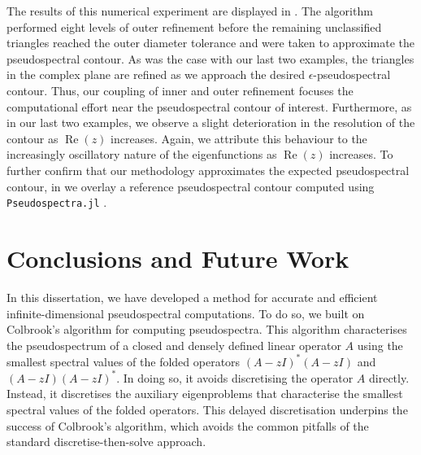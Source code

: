 The results of this numerical experiment are displayed in .  The algorithm performed eight levels of outer refinement before the remaining unclassified triangles reached the outer diameter tolerance and were taken to approximate the pseudospectral contour. As was the case with our last two examples, the triangles in the complex plane are refined as we approach the desired $\epsilon$-pseudospectral contour. Thus, our coupling of inner and outer refinement focuses the computational effort near the pseudospectral contour of interest. Furthermore, as in our last two examples, we observe a slight deterioration in the resolution of the contour as $\operatorname{Re}(z)$ increases. Again, we attribute this behaviour to the increasingly oscillatory nature of the eigenfunctions as $\operatorname{Re}(z)$ increases. To further confirm that our methodology approximates the expected pseudospectral contour, in  we overlay a reference pseudospectral contour computed using \texttt{Pseudospectra.jl} \cite{PseudospectraJL}.

















\chapter{Conclusions and Future Work}



In this dissertation, we have developed a method for accurate and efficient infinite-dimensional pseudospectral computations. To do so, we built on Colbrook's algorithm for computing pseudospectra. This algorithm characterises the pseudospectrum of a closed and densely defined linear operator $A$ using the smallest spectral values of the folded operators $(A-zI)^*(A-zI)$ and $(A-zI)(A-zI)^*.$ In doing so, it avoids discretising the operator $A$ directly. Instead, it discretises the auxiliary eigenproblems that characterise the smallest spectral values of the folded operators. This delayed discretisation underpins the success of Colbrook's algorithm, which avoids the common pitfalls of the standard discretise-then-solve approach.


